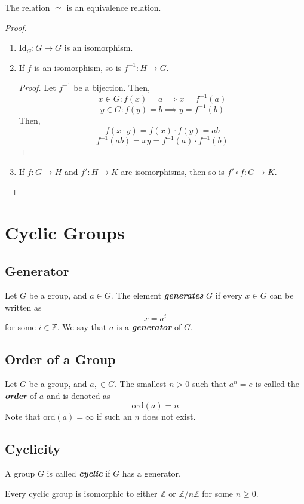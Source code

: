 \documentclass{report}
\newcommand{\Z}{\mathbb{Z}}
\newcommand{\modclass}[1]{\Z/{#1}\Z}
\newcommand{\textib}[1]{\textit{\textbf{{#1}}}}
\newcommand{\Id}{\text{Id}}
\newcommand{\ord}{\text{ord}}
\newcommand{\theorem}[1]{\begin{tcolorbox}[title=\textit{Theorem}]{#1}\end{tcolorbox}}
\begin{document}
\theorem {
    The relation $\simeq$ is an equivalence relation.
}
\begin{proof}
\begin{enumerate}[label=\textit{(\roman*)}]
    \item $\Id_G : G \to G$ is an isomorphism.
    \item If $f$ is an isomorphism, so is $f^{-1} : H \to G$.
        \begin{proof}
            Let $f^{-1}$ be a bijection. Then,
            \[x \in G : f(x) = a \implies x = f^{-1}(a)\]
            \[y \in G : f(y) = b \implies y = f^{-1}(b)\]
            Then,
            \[f(x \cdot y) = f(x) \cdot f(y) = ab\]
            \[f^{-1}(ab) = xy = f^{-1}(a) \cdot f^{-1}(b)\]
        \end{proof}
    \item If $f : G \to H$ and $f' : H \to K$ are isomorphisms, then so is $f' \circ f : G \to K$. 
\end{enumerate}
\end{proof}





\section{Cyclic Groups}
\subsection{Generator}
Let $G$ be a group, and $a \in G$. The element \textib{generates} $G$ if every $x \in G$ can be 
written as 
\[x = a^i\]
for some $i \in \Z$. We say that $a$ is a \textib{generator} of $G$.


\subsection{Order of a Group}
Let $G$ be a group, and $a, \in G$. The smallest $n > 0$ such that $a^n = e$ is called the
\textib{order} of $a$ and is denoted as
\[\ord(a) = n\]
Note that $\ord(a) = \infty$ if such an $n$ does not exist.


\subsection{Cyclicity}
A group $G$ is called \textib{cyclic} if $G$ has a generator.

\theorem {
    Every cyclic group is isomorphic to either $\Z$ or $\modclass{n}$ for some $n \geq 0$.
}
\end{document}

